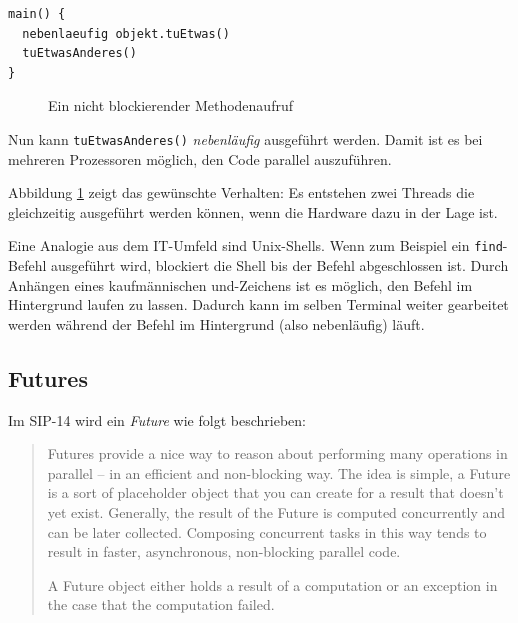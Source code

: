 \begin{lstlisting}[caption={Nebenläufiger Methodenaufruf},label={lst:codeConcurrent},captionpos=b]
main() {
  nebenlaeufig objekt.tuEtwas()
  tuEtwasAnderes()
}
\end{lstlisting}

\begin{figure}[htbp]
  \centering
  \caption{Ein nicht blockierender Methodenaufruf }
  \label{nonBlockingCall}
\end{figure}

Nun kann \texttt{tuEtwasAnderes()} \emph{nebenläufig} ausgeführt werden. Damit
ist es bei mehreren Prozessoren möglich, den Code parallel auszuführen.

Abbildung \ref{nonBlockingCall} zeigt das gewünschte Verhalten:
Es entstehen zwei Threads die gleichzeitig ausgeführt werden können,
wenn die Hardware dazu in der Lage ist.

Eine Analogie aus dem IT-Umfeld sind Unix-Shells. Wenn zum Beispiel ein
\texttt{find}-Befehl ausgeführt wird, blockiert die Shell bis der Befehl
abgeschlossen ist. Durch Anhängen eines kaufmännischen \glqq und\grqq{}-Zeichens 
ist es möglich,
den Befehl im Hintergrund laufen zu lassen. Dadurch kann im selben
Terminal weiter gearbeitet werden während der Befehl im Hintergrund (also nebenläufig)
läuft.

\subsection{Futures}

Im SIP-14 wird ein \emph{Future} wie folgt beschrieben:
\begin{quote}
Futures provide a nice way to reason about performing many operations in 
parallel – in an efficient and non-blocking way. The idea is simple, a Future 
is a sort of placeholder object that you can create for a result that doesn’t 
yet exist. Generally, the result of the Future is computed concurrently and can 
be later collected. Composing concurrent tasks in this way tends to result in 
faster, asynchronous, non-blocking parallel code.

A Future object either holds a result of a computation or an 
exception in the case that the computation failed.
\end{quote}


